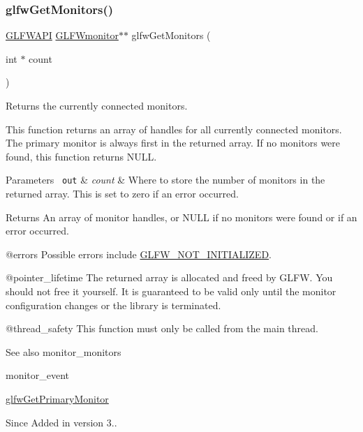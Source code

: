 \subsubsection{\texorpdfstring{glfwGetMonitors()}{glfwGetMonitors()}}
{\footnotesize\ttfamily \mbox{\hyperlink{glfw3_8h_a56da5036b2cc259351ae22fd6439bb47}{G\+L\+F\+W\+A\+PI}} \mbox{\hyperlink{group__monitor_ga8d9efd1cde9426692c73fe40437d0ae3}{G\+L\+F\+Wmonitor}}$\ast$$\ast$ glfw\+Get\+Monitors (\begin{DoxyParamCaption}\item[{int $\ast$}]{count }\end{DoxyParamCaption})}



Returns the currently connected monitors. 

This function returns an array of handles for all currently connected monitors. The primary monitor is always first in the returned array. If no monitors were found, this function returns {\ttfamily N\+U\+LL}.


\begin{DoxyParams}[1]{Parameters}
\mbox{\texttt{ out}}  & {\em count} & Where to store the number of monitors in the returned array. This is set to zero if an error occurred. \\
\hline
\end{DoxyParams}
\begin{DoxyReturn}{Returns}
An array of monitor handles, or {\ttfamily N\+U\+LL} if no monitors were found or if an error occurred.
\end{DoxyReturn}
@errors Possible errors include \mbox{\hyperlink{group__errors_ga2374ee02c177f12e1fa76ff3ed15e14a}{G\+L\+F\+W\+\_\+\+N\+O\+T\+\_\+\+I\+N\+I\+T\+I\+A\+L\+I\+Z\+ED}}.

@pointer\+\_\+lifetime The returned array is allocated and freed by G\+L\+FW. You should not free it yourself. It is guaranteed to be valid only until the monitor configuration changes or the library is terminated.

@thread\+\_\+safety This function must only be called from the main thread.

\begin{DoxySeeAlso}{See also}
monitor\+\_\+monitors 

monitor\+\_\+event 

\mbox{\hyperlink{group__monitor_ga59ea49f377fe701dd76764183e64d9f4}{glfw\+Get\+Primary\+Monitor}}
\end{DoxySeeAlso}
\begin{DoxySince}{Since}
Added in version 3.. 
\end{DoxySince}
\mbox{\label{group__monitor_ga11bc263d3967b86e2ec3e5e48762206d}} 

